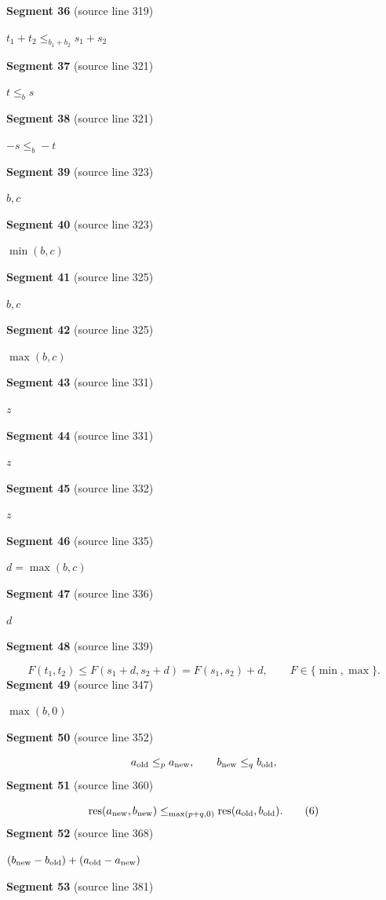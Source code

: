 \documentclass[11pt]{article}
\begin{document}
\textbf{Segment 36} (source line 319)\par
\( t_1+t_2\le_{b_1+b_2}s_1+s_2 \)\par
\textbf{Segment 37} (source line 321)\par
\( t\le_b s \)\par
\textbf{Segment 38} (source line 321)\par
\( -s\le_b -t \)\par
\textbf{Segment 39} (source line 323)\par
\( b,c \)\par
\textbf{Segment 40} (source line 323)\par
\( \min(b,c) \)\par
\textbf{Segment 41} (source line 325)\par
\( b,c \)\par
\textbf{Segment 42} (source line 325)\par
\( \max(b,c) \)\par
\textbf{Segment 43} (source line 331)\par
\( z \)\par
\textbf{Segment 44} (source line 331)\par
\( z \)\par
\textbf{Segment 45} (source line 332)\par
\( z \)\par
\textbf{Segment 46} (source line 335)\par
\( d=\max(b,c) \)\par
\textbf{Segment 47} (source line 336)\par
\( d \)\par
\textbf{Segment 48} (source line 339)\par
\[
F(t_1,t_2)
 \le F(s_1+d,s_2+d)
 =F(s_1,s_2)+d,\qquad F\in\{\min,\max\}.
\tag{5}
\]
\textbf{Segment 49} (source line 347)\par
\( \max(b,0) \)\par
\textbf{Segment 50} (source line 352)\par
\[
a_{\rm old}\le_p a_{\rm new},
\qquad
b_{\rm new}\le_q b_{\rm old},
\]
\textbf{Segment 51} (source line 360)\par
\[
\mathrm{res}(a_{\rm new},b_{\rm new})
 \le_{\max(p+q,0)}
\mathrm{res}(a_{\rm old},b_{\rm old}).
\tag{6}
\]
\textbf{Segment 52} (source line 368)\par
\( (b_{\rm new}-b_{\rm old})+(a_{\rm old}-a_{\rm new}) \)\par
\textbf{Segment 53} (source line 381)\par
\end{document}
